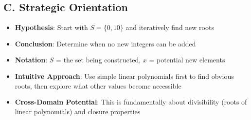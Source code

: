 \documentclass[12pt]{article}
\begin{document}
\begin{problemconfigbox}
\subsection*{C. Strategic Orientation}
\begin{itemize}[leftmargin=*]
    \item \textbf{Hypothesis}: Start with $S = \{0, 10\}$ and iteratively find new roots
    \item \textbf{Conclusion}: Determine when no new integers can be added
    \item \textbf{Notation}: $S$ = the set being constructed, $x$ = potential new elements
    \item \textbf{Intuitive Approach}: Use simple linear polynomials first to find obvious roots, then explore what other values become accessible
    \item \textbf{Cross-Domain Potential}: This is fundamentally about divisibility (roots of linear polynomials) and closure properties
\end{itemize}
\end{problemconfigbox}
\end{document}
